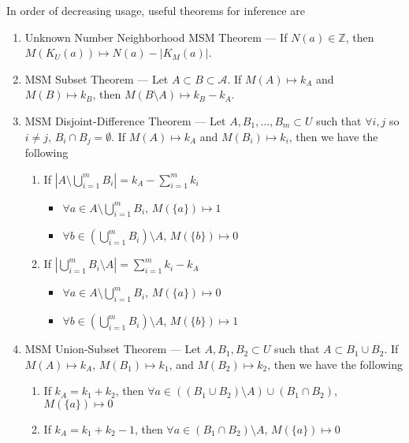 \begin{remark}
In order of decreasing usage, useful theorems for inference are
\begin{enumerate}[label=\Alph*)]
    \item Unknown Number Neighborhood MSM Theorem --- If $N(a)\in\mathbb{Z}$, then $M(K_U(a))\mapsto N(a)-|K_M(a)|$.

    \item MSM Subset Theorem --- Let $A\subset B\subset\mathcal{A}$. If $M(A)\mapsto k_A$ and $M(B)\mapsto k_B$, then $M(B\setminus A)\mapsto k_B-k_A$.

    \item MSM Disjoint-Difference Theorem --- Let $A,B_1,\dots,B_m\subset U$ such that $\forall i,j$ so $i\neq j$, $B_i\cap B_j=\emptyset$. If $M(A)\mapsto k_A$ and $M(B_i)\mapsto k_i$, then we have the following 
    \begin{enumerate}[label=\arabic*.]
        \item If $|A\setminus\bigcup_{i=1}^mB_i|=k_A-\sum_{i=1}^mk_i$\begin{itemize}
            \item $\forall a\in A\setminus\bigcup_{i=1}^mB_i$, $M(\{a\})\mapsto1$
            \item $\forall b\in(\bigcup_{i=1}^mB_i)\setminus A$, $M(\{b\})\mapsto0$
        \end{itemize}
        \item If $|\bigcup_{i=1}^mB_i\setminus A|=\sum_{i=1}^mk_i-k_A$\begin{itemize}
            \item $\forall a\in A\setminus\bigcup_{i=1}^mB_i$, $M(\{a\})\mapsto0$
            \item $\forall b\in(\bigcup_{i=1}^mB_i)\setminus A$, $M(\{b\})\mapsto1$
        \end{itemize}
    \end{enumerate}

    \item MSM Union-Subset Theorem --- Let $A,B_1,B_2\subset U$ such that $A\subset B_1\cup B_2$. If $M(A)\mapsto k_A$, $M(B_1)\mapsto k_1$, and $M(B_2)\mapsto k_2$, then we have the following \begin{enumerate}[label=\arabic*.]
        \item If $k_A=k_1+k_2$, then $\forall a\in((B_1\cup B_2)\setminus A)\cup (B_1\cap B_2)$, $M(\{a\})\mapsto 0$
        \item If $k_A=k_1+k_2-1$, then $\forall a\in(B_1\cap B_2)\setminus A$, $M(\{a\})\mapsto 0$
    \end{enumerate}
\end{enumerate}
\end{remark}

